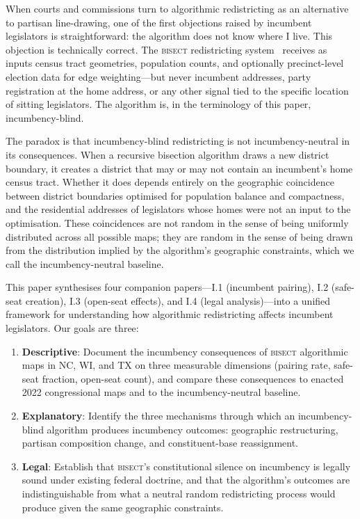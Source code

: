 \label{sec:introduction}

When courts and commissions turn to algorithmic redistricting as an alternative to
partisan line-drawing, one of the first objections raised by incumbent legislators is
straightforward: the algorithm does not know where I live. This objection is technically
correct. The \textsc{bisect} redistricting system~\citep{bisect2024} receives as inputs
census tract geometries, population counts, and optionally precinct-level election data
for edge weighting---but never incumbent addresses, party registration at the home
address, or any other signal tied to the specific location of sitting legislators.
The algorithm is, in the terminology of this paper, incumbency-blind.

The paradox is that incumbency-blind redistricting is not incumbency-neutral in its
consequences. When a recursive bisection algorithm draws a new district boundary, it
creates a district that may or may not contain an incumbent's home census tract.
Whether it does depends entirely on the geographic coincidence between district boundaries
optimised for population balance and compactness, and the residential addresses of
legislators whose homes were not an input to the optimisation. These coincidences are not
random in the sense of being uniformly distributed across all possible maps; they are random
in the sense of being drawn from the distribution implied by the algorithm's geographic
constraints, which we call the incumbency-neutral baseline.

This paper synthesises four companion papers---I.1 (incumbent pairing), I.2 (safe-seat
creation), I.3 (open-seat effects), and I.4 (legal analysis)---into a unified framework
for understanding how algorithmic redistricting affects incumbent legislators. Our goals
are three:

\begin{enumerate}
  \item \textbf{Descriptive}: Document the incumbency consequences of \textsc{bisect}
    algorithmic maps in NC, WI, and TX on three measurable dimensions (pairing rate,
    safe-seat fraction, open-seat count), and compare these consequences to enacted
    2022 congressional maps and to the incumbency-neutral baseline.
  \item \textbf{Explanatory}: Identify the three mechanisms through which an
    incumbency-blind algorithm produces incumbency outcomes: geographic restructuring,
    partisan composition change, and constituent-base reassignment.
  \item \textbf{Legal}: Establish that \textsc{bisect}'s constitutional silence on
    incumbency is legally sound under existing federal doctrine, and that the
    algorithm's outcomes are indistinguishable from what a neutral random redistricting
    process would produce given the same geographic constraints.
\end{enumerate}

